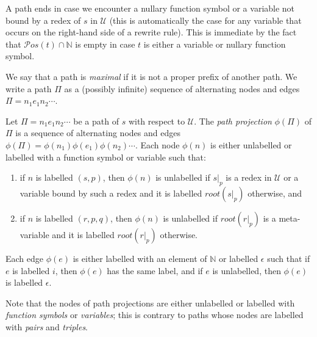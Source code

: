 \documentclass{LMCS}
\theoremstyle{definition}
\newcommand{\pos}[1]{\mathcal{P}os(#1)}
\newcommand{\rs}[1]{root(#1)}
\newcommand{\natnum}{\mathbb{N}}
\newcommand{\apath}{\Pi}
\begin{document}
A path ends in case we encounter a nullary function symbol or a variable not bound by a redex of $s$ in $\mathcal{U}$ (this is automatically the case for any variable that occurs on the right-hand side of a rewrite rule). This is immediate by the fact that $\pos{t} \cap \natnum$ is empty in case $t$ is either a variable or nullary function symbol.

We say that a path is \emph{maximal} if it is not a proper prefix of another path. We write a path $\apath$ as a (possibly infinite) sequence of alternating nodes and edges $\apath = n_1 e_1 n_2 \cdots$. 

\begin{defi}
Let $\apath = n_1 e_1 n_2 \cdots $ be a path of $s$ with respect to $\mathcal{U}$. The \emph{path projection} $\phi(\apath)$ of $\apath$ is a sequence of alternating nodes and edges $\phi(\apath) = \phi(n_1) \phi(e_1) \phi(n_2) \cdots$. Each node $\phi(n)$ is either unlabelled or labelled with a function symbol or variable such that:
\begin{enumerate}[(1)]
\item
if $n$ is labelled $(s, p)$, then $\phi(n)$ is unlabelled if $s|_p$ is a redex in $\mathcal{U}$ or a variable bound by such a redex and it is labelled $\rs{s|_p}$ otherwise, and
\item
if $n$ is labelled $(r, p, q)$, then $\phi(n)$ is unlabelled if $\rs{r|_p}$ is a meta-variable and it is labelled $\rs{r|_p}$ otherwise.
\end{enumerate}
Each edge $\phi(e)$ is either labelled with an element of $\natnum$ or labelled $\epsilon$ such that if $e$ is labelled $i$, then $\phi(e)$ has the same label, and if $e$ is unlabelled, then $\phi(e)$ is labelled $\epsilon$.
\end{defi}

\noindent Note that the nodes of path projections are either unlabelled or labelled with \emph{function symbols} or \emph{variables}; this is contrary to paths whose nodes are labelled with \emph{pairs} and \emph{triples}. 
\end{document}
